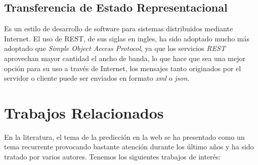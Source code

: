 \subsection{Transferencia de Estado Representacional}

Es un estilo de desarrollo de software para sistemas distribuidos mediante Internet. El uso de REST, de sus siglas en ingles, ha sido adoptado mucho más adoptado que  \emph{Simple Object Access Protocol}, ya que los servicios \emph{REST} aprovechan mayor cantidad el ancho de banda, lo que hace que sea una mejor opción para su uso a través de Internet, los mensajes tanto originados por el servidor o cliente puede ser enviados en formato \emph{xml} o \emph{json}. 



\section{Trabajos Relacionados}

En la literatura, el tema de la predicción en la web se ha presentado como un tema recurrente provocando bastante atención durante los último años y ha sido tratado por 
varios autores. Tenemos los siguientes trabajos de interés:





